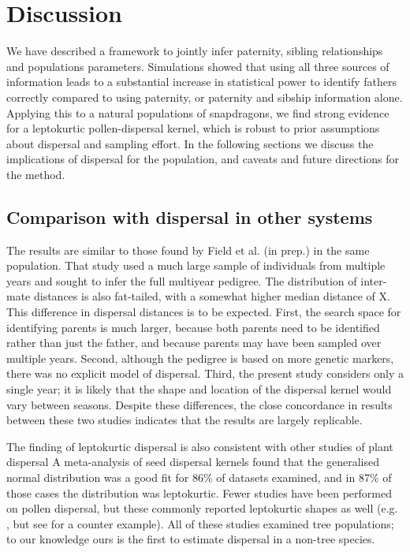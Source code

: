 \documentclass[10pt, a4paper, twocolumn]{article} %
\begin{document}
\section{Discussion}

We have described a framework to jointly infer paternity, sibling relationships and populations parameters. Simulations showed that using all three sources of information leads to a substantial increase in statistical power to identify fathers correctly compared to using paternity, or paternity and sibship information alone. Applying this to a natural populations of snapdragons, we find strong evidence for a leptokurtic pollen-dispersal kernel, which is robust to prior assumptions about dispersal and sampling effort. In the following sections we discuss the implications of dispersal for the population, and caveats and future directions for the method.

\subsection{Comparison with dispersal in other systems}

The results are similar to those found by Field et al. (in prep.) in the same population.
That study used a much large sample of individuals from multiple years and sought to infer the full multiyear pedigree.
The distribution of inter-mate distances is also fat-tailed, with a somewhat higher median distance of X.
This difference in dispersal distances is to be expected.
First, the search space for identifying parents is much larger, because both parents need to be identified rather than just the father, and because parents may have been sampled over multiple years.
Second, although the pedigree is based on more genetic markers, there was no explicit model of dispersal.
Third, the present study considers only a single year; it is likely that the shape and location of the dispersal kernel would vary between seasons.
Despite these differences, the close concordance in results between these two studies indicates that the results are largely replicable.

The finding of leptokurtic dispersal is also consistent with other studies of plant dispersal
A meta-analysis of seed dispersal kernels found that the generalised normal distribution was a good fit for 86\% of datasets examined, and in 87\% of those cases the distribution was leptokurtic.
Fewer studies have been performed on pollen dispersal, but these commonly reported leptokurtic shapes as well (e.g. \cite{adams1992using, austerlitz2004using, robledo2005patterns, klein2008pollen, burczyk2019patterns}, but see \cite{ottewell2012pollen} for a counter example).
All of these studies examined tree populations; to our knowledge ours is the first to estimate dispersal in a non-tree species.
\end{document}
